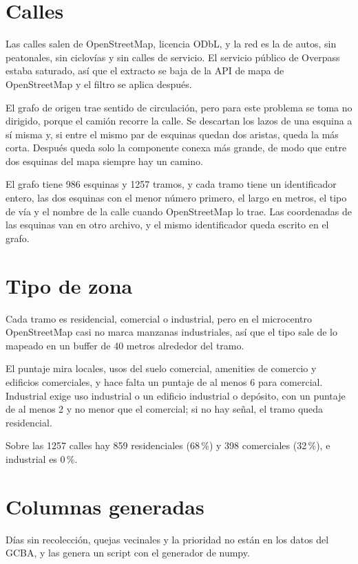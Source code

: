 \documentclass[12pt,a4paper]{report}
\begin{document}
\section{Calles}

Las calles salen de OpenStreetMap, licencia ODbL, y la red es la de autos, sin peatonales, sin ciclovías y sin calles de servicio. El servicio público de Overpass estaba saturado, así que el extracto se baja de la API de mapa de OpenStreetMap y el filtro se aplica después.

El grafo de origen trae sentido de circulación, pero para este problema se toma no dirigido, porque el camión recorre la calle. Se descartan los lazos de una esquina a sí misma y, si entre el mismo par de esquinas quedan dos aristas, queda la más corta. Después queda solo la componente conexa más grande, de modo que entre dos esquinas del mapa siempre hay un camino.

El grafo tiene 986 esquinas y 1257 tramos, y cada tramo tiene un identificador entero, las dos esquinas con el menor número primero, el largo en metros, el tipo de vía y el nombre de la calle cuando OpenStreetMap lo trae. Las coordenadas de las esquinas van en otro archivo, y el mismo identificador queda escrito en el grafo.

\section{Tipo de zona}

Cada tramo es residencial, comercial o industrial, pero en el microcentro OpenStreetMap casi no marca manzanas industriales, así que el tipo sale de lo mapeado en un buffer de 40 metros alrededor del tramo.

El puntaje mira locales, usos del suelo comercial, amenities de comercio y edificios comerciales, y hace falta un puntaje de al menos 6 para comercial. Industrial exige uso industrial o un edificio industrial o depósito, con un puntaje de al menos 2 y no menor que el comercial; si no hay señal, el tramo queda residencial.

Sobre las 1257 calles hay 859 residenciales (68\,\%) y 398 comerciales (32\,\%), e industrial es 0\,\%.

\section{Columnas generadas}

Días sin recolección, quejas vecinales y la prioridad no están en los datos del GCBA, y las genera un script con el generador de numpy.
\end{document}

